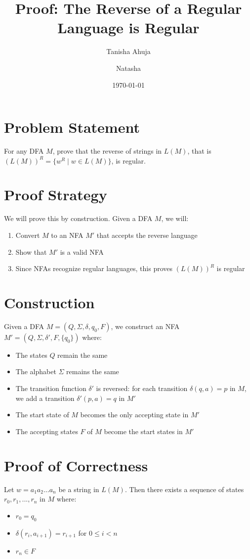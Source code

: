 \documentclass{article}
\title{Proof: The Reverse of a Regular Language is Regular}
\author{Tanisha Ahuja \and Natasha}
\date{\today}
\begin{document}
\maketitle

\section{Problem Statement}
For any DFA $M$, prove that the reverse of strings in $L(M)$, that is $(L(M))^R = \{ w^R \mid w \in L(M) \}$, is regular.

\section{Proof Strategy}
We will prove this by construction. Given a DFA $M$, we will:
\begin{enumerate}
    \item Convert $M$ to an NFA $M'$ that accepts the reverse language
    \item Show that $M'$ is a valid NFA
    \item Since NFAs recognize regular languages, this proves $(L(M))^R$ is regular
\end{enumerate}

\section{Construction}
Given a DFA $M = (Q, \Sigma, \delta, q_0, F)$, we construct an NFA $M' = (Q, \Sigma, \delta', F, \{q_0\})$ where:
\begin{itemize}
    \item The states $Q$ remain the same
    \item The alphabet $\Sigma$ remains the same
    \item The transition function $\delta'$ is reversed: for each transition $\delta(q,a) = p$ in $M$, 
          we add a transition $\delta'(p,a) = q$ in $M'$
    \item The start state of $M$ becomes the only accepting state in $M'$
    \item The accepting states $F$ of $M$ become the start states in $M'$
\end{itemize}

\section{Proof of Correctness}
Let $w = a_1a_2...a_n$ be a string in $L(M)$. Then there exists a sequence of states 
$r_0,r_1,...,r_n$ in $M$ where:
\begin{itemize}
    \item $r_0 = q_0$
    \item $\delta(r_i,a_{i+1}) = r_{i+1}$ for $0 \leq i < n$
    \item $r_n \in F$
\end{itemize}
\end{document}
